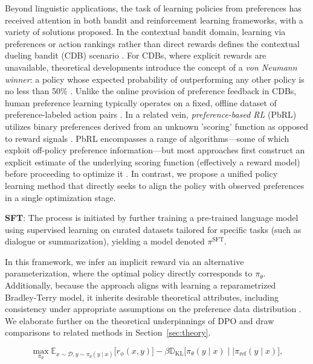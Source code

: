 Beyond linguistic applications, the task of learning policies from preferences has received attention in both bandit and reinforcement learning frameworks, with a variety of solutions proposed. In the contextual bandit domain, learning via preferences or action rankings rather than direct rewards defines the contextual dueling bandit (CDB) scenario \citep{yue2012karmed, dudik2015contextual}. For CDBs, where explicit rewards are unavailable, theoretical developments introduce the concept of a \textit{von Neumann winner}: a policy whose expected probability of outperforming any other policy is no less than 50\% \citep{dudik2015contextual}. Unlike the online provision of preference feedback in CDBs, human preference learning typically operates on a fixed, offline dataset of preference-labeled action pairs \citep{yan2022human}. In a related vein, \textit{preference-based RL} (PbRL) utilizes binary preferences derived from an unknown 'scoring' function as opposed to reward signals \citep{BusaFekete2014, ruiz2023dueling}. PbRL encompasses a range of algorithms—some of which exploit off-policy preference information—but most approaches first construct an explicit estimate of the underlying scoring function (effectively a reward model) before proceeding to optimize it \citep{jain2013learning, BusaFekete2014, christiano2017deep, sadigh2017active, kupcsik2018learning}. In contrast, we propose a unified policy learning method that directly seeks to align the policy with observed preferences in a single optimization stage.

\textbf{SFT}: The process is initiated by further training a pre-trained language model using supervised learning on curated datasets tailored for specific tasks (such as dialogue or summarization), yielding a model denoted $\pi^\text{SFT}$.

In this framework, we infer an implicit reward via an alternative parameterization, where the optimal policy directly corresponds to $\pi_\theta$. Additionally, because the approach aligns with learning a reparametrized Bradley-Terry model, it inherits desirable theoretical attributes, including consistency under appropriate assumptions on the preference data distribution \cite{bong2022generalized}. We elaborate further on the theoretical underpinnings of DPO and draw comparisons to related methods in Section~\ref{sec:theory}.

\begin{equation}\label{eq:RL}
\max_{\pi_{\theta}}  \mathbb{E}_{x\sim \mathcal{D}, y\sim \pi_{\theta}(y \mid x)}\bigl[r_{\phi}(x, y)\bigr] - \beta\mathbb{D}_{\textrm{KL}}\bigl[\pi_{\theta}(y\mid x)\mid \mid \pi_\text{ref}(y\mid x)\bigr],
\end{equation}

